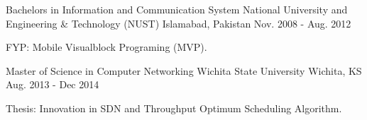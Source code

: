 

\begin{cventries}

  \cventry
    {Bachelors in Information and Communication System} %
    {National University and Engineering \& Technology (NUST)} %
    {Islamabad, Pakistan} %
    {Nov. 2008 - Aug. 2012} %
    {
      \begin{cvitems} %
        \item {FYP: Mobile Visualblock Programing (MVP).}
      \end{cvitems}
    }

  \cventry
    {Master of Science in Computer Networking} %
    {Wichita State University } %
    {Wichita, KS} %
    {Aug. 2013 - Dec 2014} %
    {
      \begin{cvitems} %
        \item {Thesis: Innovation in SDN and Throughput Optimum Scheduling Algorithm.}
      \end{cvitems}
    }
\end{cventries}
